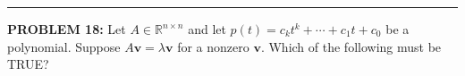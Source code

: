 \documentclass[12pt]{amsart}
\newcommand{\divider}{
  \vspace{-1em} %
  \noindent
  \raisebox{-0.15ex}{\textbullet}%
  \hspace{0.5em}%
  \rule[0.5ex]{0.95\textwidth}{1.0pt}%
  \hspace{0.5em}%
  \raisebox{-0.15ex}{\textbullet}%
  \vspace{0em} %
}
\begin{document}
%
%
%

\divider

{\bf PROBLEM 18:}
%
Let $A \in \mathbb{R}^{n \times n}$ and let $p(t) = c_k t^k + \cdots + c_1 t
+ c_0$ be a polynomial. Suppose $A\mathbf{v} = \lambda \mathbf{v}$ for a
nonzero $\mathbf{v}$. Which of the following must be TRUE?
\end{document}
